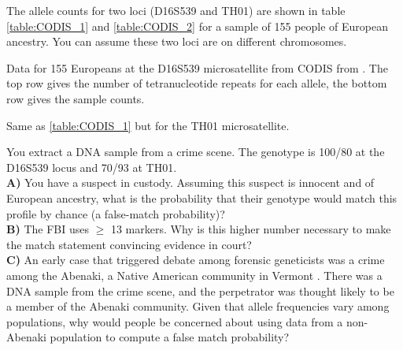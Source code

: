 {{The allele counts for two loci (D16S539
and TH01) are shown in table \ref{table:CODIS_1} and
\ref{table:CODIS_2} for a sample of 155 people of European ancestry. You can assume these two loci are on different chromosomes.

\begin{table}
{\small
\setlength{\tabcolsep}{.45\tabcolsep}
  \label{table:CODIS_1}
\caption{ Data for 155 Europeans at the D16S539 microsatellite from
  CODIS from \citet{algee:16}. The top row gives the number of
  tetranucleotide repeats for each allele, the bottom row gives the
  sample counts.}
 }

\end{table}
\vspace*{1cm}
\begin{table}
  {\small
\setlength{\tabcolsep}{.45\tabcolsep}
  \label{table:CODIS_2}
}

\caption{Same as \ref{table:CODIS_1} but for the TH01 microsatellite. }
\end{table}

\begin{question}{} \label{Q:CODIS}
You extract a DNA sample from a crime scene. The genotype is 100/80 at the
D16S539 locus and 70/93 at TH01.\\

{\bf A)} You have a suspect in custody. Assuming this suspect is innocent and of European ancestry, what is the probability
that their genotype would match this profile by chance (a false-match probability)?\\
{\bf B)} The FBI uses $\geq$ 13 markers. Why is this higher number
necessary to make the match statement convincing evidence in court?\\
{\bf C)}  An early case that triggered debate among forensic geneticists was a crime among the Abenaki, a Native American community in
Vermont \citep[see][for discussion]{lewontin:94}. There was a DNA sample from the crime scene, and the
perpetrator was thought likely to be a member of the Abenaki
community. Given that allele frequencies vary among populations, why would people be concerned about using data from a non-Abenaki population to compute a false match probability?
\end{question}


}}

